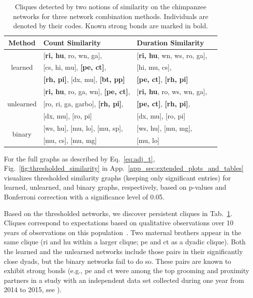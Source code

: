 \documentclass{article}
\theoremstyle{plain}
\theoremstyle{definition}
\theoremstyle{remark}
\begin{document}
\begin{table}[htb]
\centering
  \centering
  \small
  \setlength{\tabcolsep}{3pt}
\begin{tabular}{clll}
\toprule
Method & Count Similarity & Duration Similarity \\ 
\midrule
\multirow{3}{*}{learned} & 
[\textbf{ri, hu}, ro, wn, ga],& [\textbf{ri, hu}, wn, ws, ro, ga], \\ 
& [cs, hi, mu], \textbf{[pe, ct]}, & [hi, mu, cs],\\ 
& \textbf{[rh, pi]}, [dx, mu], \textbf{[bt, pp]}
& \textbf{[pe, ct]}, \textbf{[rh, pi]}
\\ 
\hline
\multirow{3}{*}{unlearned} & 
[\textbf{ri, hu}, ro, ga, wn], \textbf{[pe, ct]}, 
 & [\textbf{ri, hu}, ro, ws, wn, ga], \\
&[ro, ri, ga, garbo], \textbf{[rh, pi]},
 & \textbf{[pe, ct]}, \textbf{[rh, pi]},\\
&[dx, mu], [ro, pi]&[dx, mu], [ro, pi]
\\
\hline
\multirow{2}{*}{binary} & 
[ws, hu], [mu, lo], [mu, sp], &[ws, hu], [mu, mg], \\
&[mu, cs], [mu, mg]&[mu, lo]\\
\bottomrule
\end{tabular}
\caption{Cliques detected by two notions of similarity on the chimpanzee networks for three network combination methods. Individuals are denoted by their codes. Known strong bonds are marked in bold.}
\label{tab:cliques}
\end{table}
For the full graphs as described by Eq.~\eqref{eq:adj_t}, Fig.~\ref{fig:thresholded_similarity} in App.~\ref{app_sec:extended_plots_and_tables} visualizes thresholded similarity graphs (keeping only significant entries) for learned, unlearned, and binary graphs, respectively, based on p-values and Bonferroni correction with a significance level of 0.05.

Based on the thresholded networks, we discover persistent cliques in Tab.~\ref{tab:cliques}. Cliques correspond to expectations based on qualitative observations over 10 years of observations on this population~\cite{mitani2009male}. Two maternal brothers appear in the same clique (ri and hu within a larger clique; pe and ct as a dyadic clique). Both the learned and the unlearned networks include those pairs in their significantly close dyads, but the binary networks fail to do so. These pairs are known to exhibit strong bonds (e.g., pe and ct were among the top grooming and proximity partners in a study with an independent data set collected during one year from 2014 to 2015, see \citet{sandel2020adolescent}). 
\end{document}
